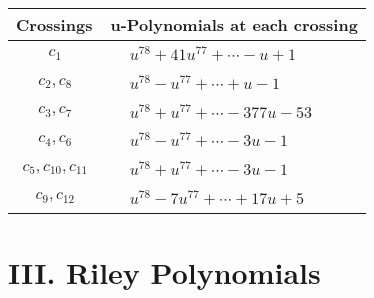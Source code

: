 \documentclass[1p]{elsarticle_modified}
\theoremstyle{definition}
\begin{document}
\begin{tabular}{m{50pt}|m{274pt}}
Crossings & \hspace{64pt}u-Polynomials at each crossing \\
\hline $$\begin{aligned}c_{1}\end{aligned}$$&$\begin{aligned}
&u^{78}+41 u^{77}+\cdots- u+1
\end{aligned}$\\
\hline $$\begin{aligned}c_{2},c_{8}\end{aligned}$$&$\begin{aligned}
&u^{78}- u^{77}+\cdots+u-1
\end{aligned}$\\
\hline $$\begin{aligned}c_{3},c_{7}\end{aligned}$$&$\begin{aligned}
&u^{78}+u^{77}+\cdots-377 u-53
\end{aligned}$\\
\hline $$\begin{aligned}c_{4},c_{6}\end{aligned}$$&$\begin{aligned}
&u^{78}- u^{77}+\cdots-3 u-1
\end{aligned}$\\
\hline $$\begin{aligned}c_{5},c_{10},c_{11}\end{aligned}$$&$\begin{aligned}
&u^{78}+u^{77}+\cdots-3 u-1
\end{aligned}$\\
\hline $$\begin{aligned}c_{9},c_{12}\end{aligned}$$&$\begin{aligned}
&u^{78}-7 u^{77}+\cdots+17 u+5
\end{aligned}$\\
\hline
\end{tabular}\newpage\renewcommand{\arraystretch}{1}
\centering \section*{ III. Riley Polynomials}
\end{document}

